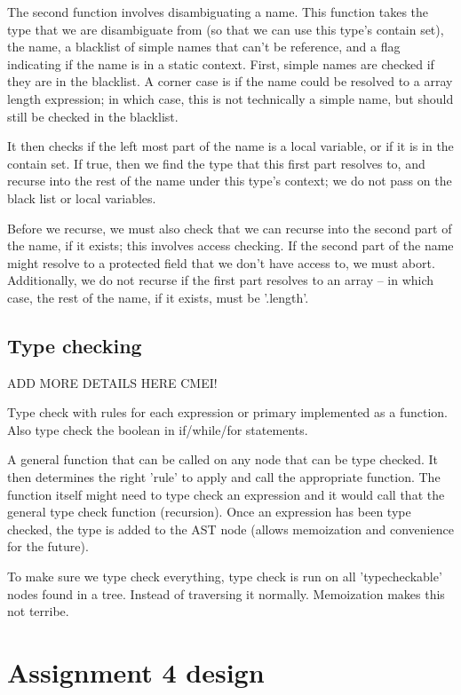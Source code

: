 \documentclass[12pt]{article}
\begin{document}
The second function involves disambiguating a name.  This function takes the
type that we are disambiguate from (so that we can use this type's contain set),
the name, a blacklist of simple names that can't be reference, and
a flag indicating if the name is in a static context.  First, simple names are
checked if they are in the blacklist.  A corner case is if
the name could be resolved to a array length expression;  in which case, this is
not technically a simple name, but should still be checked in the blacklist.

It then checks if the left most part of the name is a local variable, or if it
is in the contain set.  If true, then we find the type that this first part
resolves to, and recurse into the rest of the name under this type's context;
we do not pass on the black list or local variables.

Before we recurse, we must also check that we can recurse into the second part
of the name, if it exists; this involves access checking.  If the second part of
the name might resolve to a protected field that we don't have access to, we
must abort.  Additionally, we do not recurse if the first part resolves to an
array -- in which case, the rest of the name, if it exists, must be '.length'.

\subsection{Type checking}
ADD MORE DETAILS HERE CMEI!

Type check with rules for each expression or primary implemented as a function.
Also type check the boolean in if/while/for statements.

A general function that can be called on any node that can be type checked.
It then determines the right 'rule' to apply and call the appropriate function.
The function itself might need to type check an expression and it would
call that the general type check function (recursion). Once an expression has been
type checked, the type is added to the AST node (allows memoization and convenience
for the future).

To make sure we type check everything, type check is run on all 'typecheckable'
nodes found in a tree. Instead of traversing it normally. Memoization makes this
not terribe.

\section{Assignment 4 design}
\end{document}
